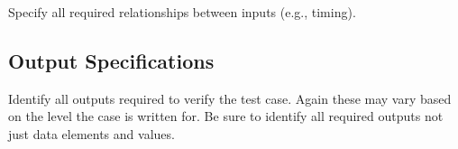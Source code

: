 \documentclass{./template/openetcs_report}
\begin{document}
Specify all required relationships between inputs (e.g., timing).

% 
% 
% 
% 

\subsection{Output Specifications} 

Identify all outputs required to verify the test case.
Again these may vary based on the level the case is written for. 
Be sure to identify all required outputs not just data elements and values.
\end{document}
